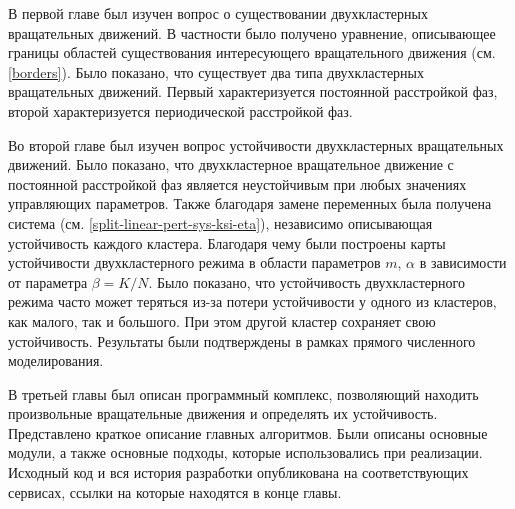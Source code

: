 В первой главе был изучен вопрос о существовании двухкластерных
вращательных движений. В частности было получено уравнение,
описывающее границы областей существования интересующего вращательного 
движения (см. \eqref{borders}). Было показано, что существует два типа
двухкластерных вращательных движений. Первый характеризуется постоянной
расстройкой фаз, второй характеризуется периодической расстройкой фаз.


Во второй главе был изучен вопрос устойчивости двухкластерных
вращательных движений. Было показано, что двухкластерное вращательное
движение с постоянной расстройкой фаз является неустойчивым при любых значениях
управляющих параметров. Также благодаря замене переменных была получена система (см. \eqref{split-linear-pert-sys-ksi-eta}),
независимо описывающая устойчивость каждого кластера. Благодаря чему были построены карты
устойчивости двухкластерного режима в области параметров $m$, $\alpha$ в зависимости от
параметра $\beta = K/N$. Было показано, что устойчивость
двухкластерного режима часто может теряться из-за потери устойчивости
у одного из кластеров, как малого, так и большого. При этом другой кластер
сохраняет свою устойчивость. Результаты были подтверждены в рамках прямого
численного моделирования.

В третьей главы был описан программный комплекс, позволяющий находить произвольные
вращательные движения и определять их устойчивость. Представлено краткое описание главных алгоритмов.
Были описаны основные модули, а также
основные подходы, которые использовались при реализации.
Исходный код и вся история разработки опубликована на соответствующих сервисах, ссылки на которые находятся
в конце главы. 
